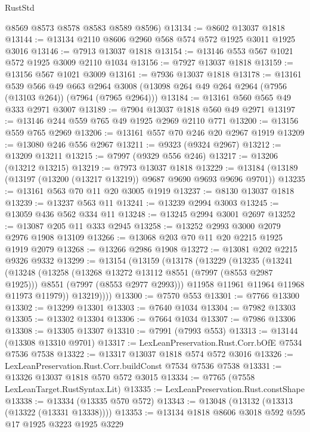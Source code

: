 \begin{lexlean}{RustStd}
\begin{coremodule}
{\begin{coremodule}
{{{{{{{{{{{{{{{{{{{{{{{{{{{{{{{{{{{{{{{{{{{      @8569
      @8573
      @8578
      @8583
      @8589
      @8596)
@13134 := @8602 @13037 @1818
@13144 := @13134 @2110 @8606 @2960 @568 @574 @572 @1925 @3011 @1925 @3016
@13146 := @7913 @13037 @1818
@13154 := @13146 @553 @567 @1021 @572 @1925 @3009 @2110 @1034
@13156 := @7927 @13037 @1818
@13159 := @13156 @567 @1021 @3009
@13161 := @7936 @13037 @1818
@13178 := @13161
    @539
    @566
    @49
    @663
    @2964
    @3008
    (@13098 @264 @49 @264 @2964 (@7956 (@13103 @264)) (@7964 (@7965 @2964)))
@13184 := @13161 @560 @565 @49 @333 @2971 @3007
@13189 := @7904 @13037 @1818 @560 @49 @2971
@13197 := @13146 @244 @559 @765 @49 @1925 @2969 @2110 @771
@13200 := @13156 @559 @765 @2969
@13206 := @13161 @557 @70 @246 @20 @2967 @1919
@13209 := @13080 @246 @556 @2967
@13211 := @9323 (@9324 @2967)
@13212 := @13209 @13211
@13215 := @7997 (@9329 @556 @246)
@13217 := @13206 (@13212 @13215)
@13219 := @7973 @13037 @1818
@13229 := @13184 (@13189 (@13197 (@13200 (@13217 @13219)) @9687 @9690 @9693 @9696 @9701))
@13235 := @13161 @563 @70 @11 @20 @3005 @1919
@13237 := @8130 @13037 @1818
@13239 := @13237 @563 @11
@13241 := @13239 @2994 @3003
@13245 := @13059 @436 @562 @334 @11
@13248 := @13245 @2994 @3001 @2697
@13252 := @13087 @205 @11 @333 @2945
@13258 := @13252 @2993 @3000 @2079 @2976 @1908 @13109
@13266 := @13068 @203 @70 @11 @20 @2215 @1925 @1919 @2079
@13268 := @13266 @2986 @1908
@13272 := @13081 @202 @2215 @9326 @9332
@13299 := @13154
    (@13159
      (@13178
        (@13229
          (@13235
            (@13241
              (@13248
                (@13258
                  (@13268 @13272 @13112 @8551 (@7997 (@8553 @2987 @1925)))
                  @8551
                  (@7997 (@8553 @2977 @2993)))
                @11958
                @11961
                @11964
                @11968
                @11973
                @11979))
            @13219))))
@13300 := @7570 @553
@13301 := @7766 @13300
@13302 := @13299 @13301
@13303 := @7640 @1034
@13304 := @7982 @13303
@13305 := @13302 @13304
@13306 := @7664 @1034
@13307 := @7986 @13306
@13308 := @13305 @13307
@13310 := @7991 (@7993 @553)
@13313 := @13144 (@13308 @13310 @9701)
@13317 := LexLeanPreservation.Rust.Corr.bOfE @7534 @7536 @7538
@13322 := @13317 @13037 @1818 @574 @572 @3016
@13326 := LexLeanPreservation.Rust.Corr.buildConst @7534 @7536 @7538
@13331 := @13326 @13037 @1818 @570 @572 @3015
@13334 := @7765 (@7558 LexLeanTarget.RustSyntax.Lit)
@13335 := LexLeanPreservation.Rust.constShape
@13338 := @13334 (@13335 @570 @572)
@13343 := @13048 (@13132 (@13313 (@13322 (@13331 @13338))))
@13353 := @13134 @1818 @8606 @3018 @592 @595 @17 @1925 @3223 @1925 @3229
}}}}}}}}}}}}}}}}}}}}}}}}}}}}}}}}}}}}}}}}}}}
\end{coremodule}}
\end{coremodule}
\end{lexlean}
